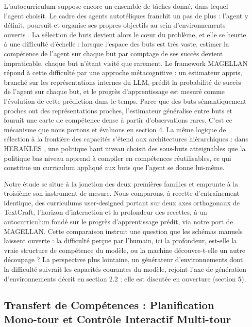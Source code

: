 \documentclass[11pt,a4paper]{article}
\begin{document}
L'autocurriculum suppose encore un ensemble de tâches donné, dans lequel l'agent choisit. Le cadre des agents autotéliques franchit un pas de plus : l'agent y définit, poursuit et organise ses propres objectifs au sein d'environnements ouverts \cite{colas2022autotelic, forestier2017imgep}. La sélection de buts devient alors le cœur du problème, et elle se heurte à une difficulté d'échelle : lorsque l'espace des buts est très vaste, estimer la compétence de l'agent sur chaque but par comptage de ses succès devient impraticable, chaque but n'étant visité que rarement. Le framework MAGELLAN \cite{gaven2025magellan} répond à cette difficulté par une approche métacognitive : un estimateur appris, branché sur les représentations internes du LLM, prédit la probabilité de succès de l'agent sur chaque but, et le progrès d'apprentissage est mesuré comme l'évolution de cette prédiction dans le temps. Parce que des buts sémantiquement proches ont des représentations proches, l'estimateur généralise entre buts et fournit une carte de compétence dense à partir d'observations rares. C'est ce mécanisme que nous portons et évaluons en section 4. La même logique de sélection à la frontière des capacités s'étend aux architectures hiérarchiques : dans HERAKLES \cite{carta2025herakles}, une politique haut niveau choisit des sous-buts atteignables que la politique bas niveau apprend à compiler en compétences réutilisables, ce qui constitue un curriculum appliqué aux buts que l'agent se donne lui-même.

Notre étude se situe à la jonction des deux premières familles et emprunte à la troisième son instrument de mesure. Nous comparons, à recette d'entraînement identique, des curriculums user-designed portant sur deux axes orthogonaux de TextCraft, l'horizon d'interaction et la profondeur des recettes, à un autocurriculum fondé sur le progrès d'apprentissage prédit, via notre port de MAGELLAN. Cette comparaison instruit une question que les schémas manuels laissent ouverte : la difficulté perçue par l'humain, ici la profondeur, est-elle la vraie structure de compétence du modèle, ou la machine découvre-t-elle un autre découpage ? La perspective plus lointaine, un générateur d'environnements dont la difficulté suivrait les capacités courantes du modèle, rejoint l'axe de génération d'environnements décrit en section 2.2 ; elle est discutée en ouverture (section 5).

\subsection{Transfert de Compétences : Planification Mono-tour et Contrôle Interactif Multi-tour}
\end{document}
